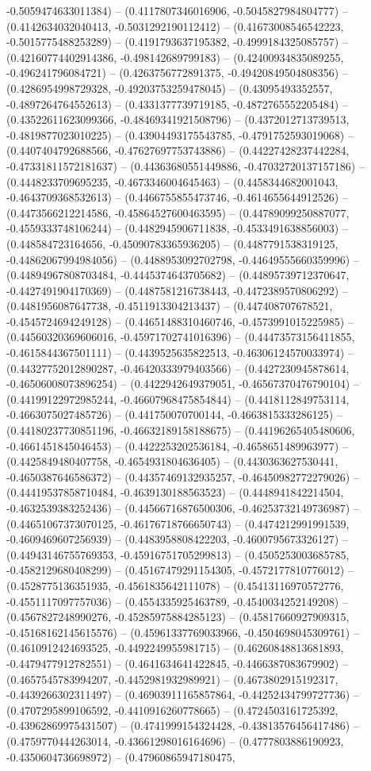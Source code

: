 -0.5059474633011384) -- (0.4117807346016906, -0.5045827984804777) -- (0.4142634032040413, -0.5031292190112412) -- (0.41673008546542223, -0.5015775488253289) -- (0.4191793637195382, -0.4999184325085757) -- (0.42160774402914386, -0.498142689799183) -- (0.42400934835089255, -0.496241796084721) -- (0.4263756772891375, -0.49420849504808356) -- (0.4286954998729328, -0.49203753259478045) -- (0.43095493352557, -0.4897264764552613) -- (0.4331377739719185, -0.4872765552205484) -- (0.43522611623099366, -0.48469341921508796) -- (0.4372012713739513, -0.4819877023010225) -- (0.43904493175543785, -0.4791752593019068) -- (0.4407404792688566, -0.47627697753743886) -- (0.44227428237442284, -0.47331811572181637) -- (0.44363680551449886, -0.47032720137157186) -- (0.4448233709695235, -0.4673346004645463) -- (0.4458344682001043, -0.4643709368532613) -- (0.4466755855473746, -0.4614655644912526) -- (0.4473566212214586, -0.45864527600463595) -- (0.44789099250887077, -0.4559333748106244) -- (0.4482945906711838, -0.4533491638856003) -- (0.448584723164656, -0.45090783365936205) -- (0.4487791538319125, -0.44862067994984056) -- (0.4488953092702798, -0.44649555660359996) -- (0.44894967808703484, -0.4445374643705682) -- (0.44895739712370647, -0.4427491904170369) -- (0.4487581216738443, -0.4472389570806292) -- (0.4481956087647738, -0.4511913304213437) -- (0.447408707678521, -0.4545724694249128) -- (0.44651488310460746, -0.4573991015225985) -- (0.44560320369606016, -0.45971702741016396) -- (0.44473573156411855, -0.4615844367501111) -- (0.4439525635822513, -0.46306124570033974) -- (0.44327752012890287, -0.46420333979403566) -- (0.4427230945878614, -0.46506008073896254) -- (0.4422942649379051, -0.46567370476790104) -- (0.44199122972985244, -0.46607968475854844) -- (0.4418112849753114, -0.4663075027485726) -- (0.441750070700144, -0.4663815333286125) -- (0.44180237730851196, -0.46632189158188675) -- (0.44196265405480606, -0.4661451845046453) -- (0.4422253202536184, -0.4658651489963977) -- (0.4425849480407758, -0.4654931804636405) -- (0.4430363627530441, -0.4650387646586372) -- (0.44357469132935257, -0.46450982772279026) -- (0.44419537858710484, -0.4639130188563523) -- (0.4448941842214504, -0.4632539383252436) -- (0.44566716876500306, -0.46253732149736987) -- (0.44651067373070125, -0.46176718766650743) -- (0.4474212991991539, -0.4609469607256939) -- (0.4483958808422203, -0.4600795673326127) -- (0.44943146755769353, -0.45916751705299813) -- (0.4505253003685785, -0.4582129680408299) -- (0.45167479291154305, -0.4572177810776012) -- (0.4528775136351935, -0.4561835642111078) -- (0.45413116970572776, -0.4551117097757036) -- (0.4554335925463789, -0.4540034252149208) -- (0.4567827248990276, -0.45285975884285123) -- (0.45817660927909315, -0.45168162145615576) -- (0.45961337769033966, -0.4504698045309761) -- (0.4610912424693525, -0.4492249955981715) -- (0.46260848813681893, -0.4479477912782551) -- (0.4641634641422845, -0.4466387083679902) -- (0.4657545783994207, -0.4452981932989921) -- (0.4673802915192317, -0.4439266302311497) -- (0.46903911165857864, -0.44252434799727736) -- (0.4707295899106592, -0.4410916260778665) -- (0.4724503161725392, -0.43962869975431507) -- (0.4741999154324428, -0.43813576456417486) -- (0.4759770444263014, -0.43661298016164696) -- (0.4777803886190923, -0.4350604736698972) -- (0.47960865947180475, 